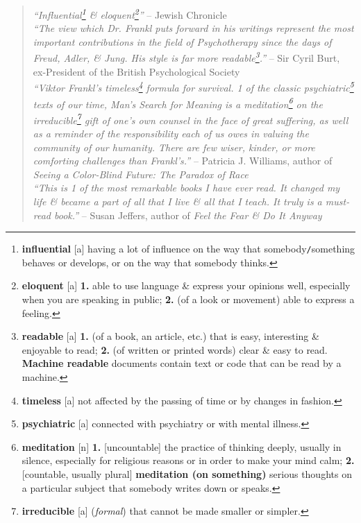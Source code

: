 \documentclass[oneside]{book}
\numberwithin{equation}{section}
\begin{document}
\begin{quotation}
	\textit{``Influential\footnote{\textbf{influential} [a] having a lot of influence on the way that somebody\texttt{/}something behaves or develops, or on the way that somebody thinks.} \& eloquent\footnote{\textbf{eloquent} [a] \textbf{1.} able to use language \& express your opinions well, especially when you are speaking in public; \textbf{2.} (of a look or movement) able to express a feeling.}''} -- Jewish Chronicle\\
	
	\textit{``The view which Dr. Frankl puts forward in his writings represent the most important contributions in the field of Psychotherapy since the days of Freud, Adler, \& Jung. His style is far more readable\footnote{\textbf{readable} [a] \textbf{1.} (of a book, an article, etc.) that is easy, interesting \& enjoyable to read; \textbf{2.} (of written or printed words) clear \& easy to read. \textbf{Machine readable} documents contain text or code that can be read by a machine.}.''} -- Sir Cyril Burt, ex-President of the British Psychological Society\\
	
	\textit{``Viktor Frankl's  timeless\footnote{\textbf{timeless} [a] not affected by the passing of time or by changes in fashion.} formula for survival. 1 of the classic psychiatric\footnote{\textbf{psychiatric} [a] connected with psychiatry or with mental illness.} texts of our time, \emph{Man's Search for Meaning} is a meditation\footnote{\textbf{meditation} [n] \textbf{1.} [uncountable] the practice of thinking deeply, usually in silence, especially for religious reasons or in order to make your mind calm; \textbf{2.} [countable, usually plural] \textbf{meditation (on something)} serious thoughts on a particular subject that somebody writes down or speaks.} on the irreducible\footnote{\textbf{irreducible} [a] (\textit{formal}) that cannot be made smaller or simpler.} gift of one's own counsel in the face of great suffering, as well as a reminder of the responsibility each of us owes in valuing the community of our humanity. There are few wiser, kinder, or more comforting challenges than Frankl's.''} -- Patricia J. Williams, author of \textit{Seeing a Color-Blind Future: The Paradox of Race}\\
	
	\textit{``This is 1 of the most remarkable books I have ever read. It changed my life \& became a part of all that I live \& all that I teach. It truly is a must-read book.''} -- Susan Jeffers, author of \textit{Feel the Fear \& Do It Anyway}\\
	

\end{quotation}
\end{document}
